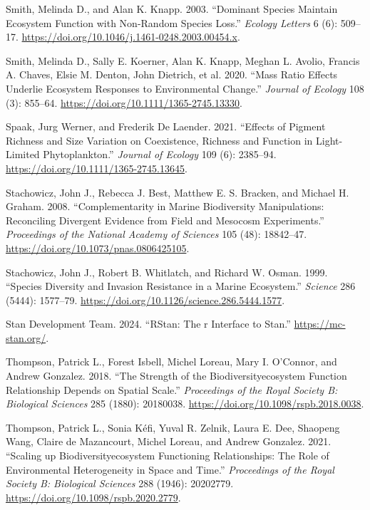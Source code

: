 \documentclass[
  letterpaper,
  DIV=11,
  numbers=noendperiod]{scrartcl}
\newlength{\cslhangindent}
\newenvironment{CSLReferences}[2] %
 {\begin{list}{}{%
  \setlength{\itemindent}{0pt}
  \setlength{\leftmargin}{0pt}
  \setlength{\parsep}{0pt}
  \ifodd #1
   \setlength{\leftmargin}{\cslhangindent}
   \setlength{\itemindent}{-1\cslhangindent}
  \fi
  \setlength{\itemsep}{#2\baselineskip}}}
 {\end{list}}
\begin{document}
\begin{CSLReferences}{1}{0}
Smith, Melinda D., and Alan K. Knapp. 2003. {``Dominant Species Maintain
Ecosystem Function with Non-Random Species Loss.''} \emph{Ecology
Letters} 6 (6): 509--17.
\url{https://doi.org/10.1046/j.1461-0248.2003.00454.x}.

Smith, Melinda D., Sally E. Koerner, Alan K. Knapp, Meghan L. Avolio,
Francis A. Chaves, Elsie M. Denton, John Dietrich, et al. 2020. {``Mass
Ratio Effects Underlie Ecosystem Responses to Environmental Change.''}
\emph{Journal of Ecology} 108 (3): 855--64.
\url{https://doi.org/10.1111/1365-2745.13330}.

Spaak, Jurg Werner, and Frederik De Laender. 2021. {``Effects of Pigment
Richness and Size Variation on Coexistence, Richness and Function in
Light-Limited Phytoplankton.''} \emph{Journal of Ecology} 109 (6):
2385--94. \url{https://doi.org/10.1111/1365-2745.13645}.

Stachowicz, John J., Rebecca J. Best, Matthew E. S. Bracken, and Michael
H. Graham. 2008. {``Complementarity in Marine Biodiversity
Manipulations: Reconciling Divergent Evidence from Field and Mesocosm
Experiments.''} \emph{Proceedings of the National Academy of Sciences}
105 (48): 18842--47. \url{https://doi.org/10.1073/pnas.0806425105}.

Stachowicz, John J., Robert B. Whitlatch, and Richard W. Osman. 1999.
{``Species Diversity and Invasion Resistance in a Marine Ecosystem.''}
\emph{Science} 286 (5444): 1577--79.
\url{https://doi.org/10.1126/science.286.5444.1577}.

Stan Development Team. 2024. {``{\textbraceleft}RStan{\textbraceright}:
The {\textbraceleft}r{\textbraceright} Interface to
{\textbraceleft}Stan{\textbraceright}.''} \url{https://mc-stan.org/}.

Thompson, Patrick L., Forest Isbell, Michel Loreau, Mary I. O'Connor,
and Andrew Gonzalez. 2018. {``The Strength of the
Biodiversity{\textendash}ecosystem Function Relationship Depends on
Spatial Scale.''} \emph{Proceedings of the Royal Society B: Biological
Sciences} 285 (1880): 20180038.
\url{https://doi.org/10.1098/rspb.2018.0038}.

Thompson, Patrick L., Sonia Kéfi, Yuval R. Zelnik, Laura E. Dee,
Shaopeng Wang, Claire de Mazancourt, Michel Loreau, and Andrew Gonzalez.
2021. {``Scaling up Biodiversity{\textendash}ecosystem Functioning
Relationships: The Role of Environmental Heterogeneity in Space and
Time.''} \emph{Proceedings of the Royal Society B: Biological Sciences}
288 (1946): 20202779. \url{https://doi.org/10.1098/rspb.2020.2779}.


\end{CSLReferences}
\end{document}
